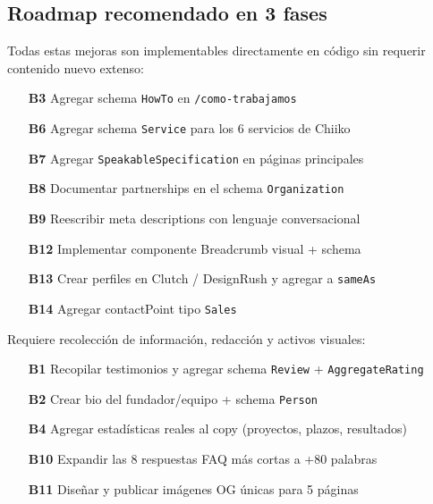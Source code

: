 \documentclass[12pt, a4paper]{article}
\begin{document}
\subsection{Roadmap recomendado en 3 fases}

\begin{tcolorbox}[colback=rojo!8, colframe=rojo, title={\faFlag\ Fase 1 — Quick Wins de alto impacto (1--2 semanas)}, fonttitle=\bfseries, breakable]
Todas estas mejoras son implementables directamente en código sin requerir contenido nuevo extenso:
\begin{enumerate}[itemsep=4pt]
  \item[\textbf{B3}] Agregar schema \texttt{HowTo} en \texttt{/como-trabajamos}
  \item[\textbf{B6}] Agregar schema \texttt{Service} para los 6 servicios de Chiiko
  \item[\textbf{B7}] Agregar \texttt{SpeakableSpecification} en páginas principales
  \item[\textbf{B8}] Documentar partnerships en el schema \texttt{Organization}
  \item[\textbf{B9}] Reescribir meta descriptions con lenguaje conversacional
  \item[\textbf{B12}] Implementar componente Breadcrumb visual + schema
  \item[\textbf{B13}] Crear perfiles en Clutch / DesignRush y agregar a \texttt{sameAs}
  \item[\textbf{B14}] Agregar contactPoint tipo \texttt{Sales}
\end{enumerate}
\end{tcolorbox}

\begin{tcolorbox}[colback=naranja!8, colframe=naranja, title={\faLayerGroup\ Fase 2 — Contenido y E-E-A-T (2--6 semanas)}, fonttitle=\bfseries, breakable]
Requiere recolección de información, redacción y activos visuales:
\begin{enumerate}[itemsep=4pt]
  \item[\textbf{B1}] Recopilar testimonios y agregar schema \texttt{Review} + \texttt{AggregateRating}
  \item[\textbf{B2}] Crear bio del fundador/equipo + schema \texttt{Person}
  \item[\textbf{B4}] Agregar estadísticas reales al copy (proyectos, plazos, resultados)
  \item[\textbf{B10}] Expandir las 8 respuestas FAQ más cortas a +80 palabras
  \item[\textbf{B11}] Diseñar y publicar imágenes OG únicas para 5 páginas
\end{enumerate}
\end{tcolorbox}
\end{document}
